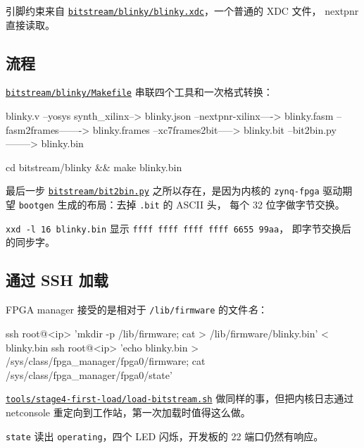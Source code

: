 \documentclass[11pt,a4paper,oneside]{article}
\newcommand{\file}[1]{{\color{bluemid}\nolinkurl{#1}}}
\newcommand{\cmd}[1]{\texttt{#1}}
\newcommand{\repo}{https://github.com/MaxClerkwell/ax7020-bringup}
\newcommand{\rfile}[1]{\href{\repo/blob/master/#1}{\color{bluemid}\nolinkurl{#1}}}
\begin{document}
引脚约束来自 \rfile{bitstream/blinky/blinky.xdc}，一个普通的 XDC 文件，
nextpnr 直接读取。

\subsection{流程}

\rfile{bitstream/blinky/Makefile} 串联四个工具和一次格式转换：

\begin{code}
blinky.v  --yosys synth_xilinx-->  blinky.json
          --nextpnr-xilinx---->  blinky.fasm
          --fasm2frames------->  blinky.frames
          --xc7frames2bit----->  blinky.bit
          --bit2bin.py-------->  blinky.bin
\end{code}

\begin{shell}
cd bitstream/blinky && make blinky.bin
\end{shell}

最后一步 \rfile{bitstream/bit2bin.py} 之所以存在，是因为内核的 \cmd{zynq-fpga}
驱动期望 \cmd{bootgen} 生成的布局：去掉 \cmd{.bit} 的 ASCII 头，
每个 32 位字做字节交换。

\begin{checkpoint}
\cmd{xxd -l 16 blinky.bin} 显示 \cmd{ffff ffff ffff ffff 6655 99aa}，
即字节交换后的同步字。
\end{checkpoint}

\subsection{通过 SSH 加载}

FPGA manager 接受的是相对于 \file{/lib/firmware} 的文件\emph{名}：

\begin{shell}
ssh root@<ip> 'mkdir -p /lib/firmware; cat > /lib/firmware/blinky.bin' < blinky.bin
ssh root@<ip> 'echo blinky.bin > /sys/class/fpga_manager/fpga0/firmware;
               cat /sys/class/fpga_manager/fpga0/state'
\end{shell}

\rfile{tools/stage4-first-load/load-bitstream.sh} 做同样的事，但把内核日志通过
netconsole 重定向到工作站，第一次加载时值得这么做。

\begin{checkpoint}
\cmd{state} 读出 \cmd{operating}，四个 LED 闪烁，开发板的 22 端口仍然有响应。
\end{checkpoint}

\end{document}
